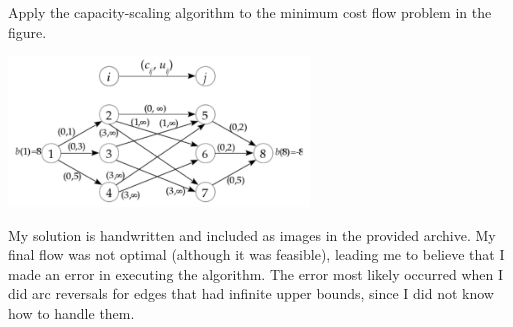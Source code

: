 \documentclass[fleqn]{homework}
\begin{document}
  \maketitle

  \begin{problem}{1}
    \begin{question}
      Apply the capacity-scaling algorithm to the minimum cost flow problem in
      the figure.

      \includegraphics[width=0.6\textwidth]{p1.png}
    \end{question}

    My solution is handwritten and included as images in the provided archive.
    My final flow was not optimal (although it was feasible), leading me to
    believe that I made an error in executing the algorithm.  The error most
    likely occurred when I did arc reversals for edges that had infinite upper
    bounds, since I did not know how to handle them.
  \end{problem}
\end{document}
